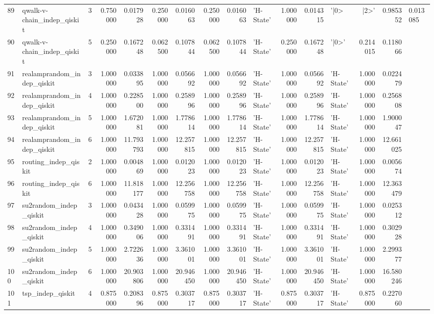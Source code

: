 \begin{table}
\begin{tabular}{llrrrrrrrlrrlrr}
89 & qwalk-v-chain_indep_qiskit & 3 & 0.750000 & 0.017928 & 0.250000 & 0.016063 & 0.250000 & 0.016063 & 'H-State' & 1.000000 & 0.014315 & '|0> & |2>' & 0.985352 & 0.013085 \\
90 & qwalk-v-chain_indep_qiskit & 5 & 0.250000 & 0.167248 & 0.062500 & 0.107844 & 0.062500 & 0.107844 & 'H-State' & 0.250000 & 0.167248 & '|0>' & 0.214015 & 0.118066 \\
91 & realamprandom_indep_qiskit & 3 & 1.000000 & 0.033895 & 1.000000 & 0.056692 & 1.000000 & 0.056692 & 'H-State' & 1.000000 & 0.056692 & 'H-State' & 1.000000 & 0.022479 \\
92 & realamprandom_indep_qiskit & 4 & 1.000000 & 0.228500 & 1.000000 & 0.258996 & 1.000000 & 0.258996 & 'H-State' & 1.000000 & 0.258996 & 'H-State' & 1.000000 & 0.256808 \\
93 & realamprandom_indep_qiskit & 5 & 1.000000 & 1.672081 & 1.000000 & 1.778614 & 1.000000 & 1.778614 & 'H-State' & 1.000000 & 1.778614 & 'H-State' & 1.000000 & 1.900047 \\
94 & realamprandom_indep_qiskit & 6 & 1.000000 & 11.793793 & 1.000000 & 12.257815 & 1.000000 & 12.257815 & 'H-State' & 1.000000 & 12.257815 & 'H-State' & 1.000000 & 12.661025 \\
95 & routing_indep_qiskit & 2 & 1.000000 & 0.004869 & 1.000000 & 0.012023 & 1.000000 & 0.012023 & 'H-State' & 1.000000 & 0.012023 & 'H-State' & 1.000000 & 0.005674 \\
96 & routing_indep_qiskit & 6 & 1.000000 & 11.818177 & 1.000000 & 12.256758 & 1.000000 & 12.256758 & 'H-State' & 1.000000 & 12.256758 & 'H-State' & 1.000000 & 12.363479 \\
97 & su2random_indep_qiskit & 3 & 1.000000 & 0.043428 & 1.000000 & 0.059975 & 1.000000 & 0.059975 & 'H-State' & 1.000000 & 0.059975 & 'H-State' & 1.000000 & 0.025312 \\
98 & su2random_indep_qiskit & 4 & 1.000000 & 0.349006 & 1.000000 & 0.331491 & 1.000000 & 0.331491 & 'H-State' & 1.000000 & 0.331491 & 'H-State' & 1.000000 & 0.302928 \\
99 & su2random_indep_qiskit & 5 & 1.000000 & 2.722636 & 1.000000 & 3.361001 & 1.000000 & 3.361001 & 'H-State' & 1.000000 & 3.361001 & 'H-State' & 1.000000 & 2.299377 \\
100 & su2random_indep_qiskit & 6 & 1.000000 & 20.903806 & 1.000000 & 20.946450 & 1.000000 & 20.946450 & 'H-State' & 1.000000 & 20.946450 & 'H-State' & 1.000000 & 16.580246 \\
101 & tsp_indep_qiskit & 4 & 0.875000 & 0.208396 & 0.875000 & 0.303717 & 0.875000 & 0.303717 & 'H-State' & 0.875000 & 0.303717 & 'H-State' & 0.875000 & 0.227060 \\

\end{tabular}
\end{table}
